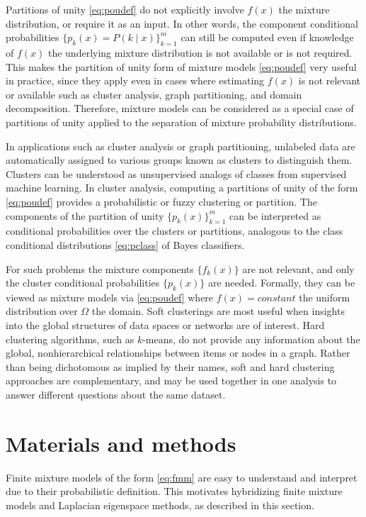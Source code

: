 \documentclass[10pt,letterpaper]{article}
\begin{document}
Partitions of unity \eqref{eq:poudef} do not explicitly involve $f(x)$ the mixture distribution, or require it as an input.
In other words, the component conditional probabilities $\{p_k(x) = P(k\mid x)\}_{k = 1}^m$ can still be computed even if knowledge of $f(x)$ the underlying mixture distribution is not available or is not required.
This makes the partition of unity form of mixture models \eqref{eq:poudef} very useful in practice, since they apply even in cases where estimating $f(x)$ is not relevant or available such as cluster analysis, graph partitioning, and domain decomposition.
Therefore, mixture models can be considered as a special case of partitions of unity applied to the separation of mixture probability distributions.

In applications such as cluster analysis or graph partitioning, unlabeled data are automatically assigned to various groups known as clusters to distinguish them.
Clusters can be understood as unsupervised analogs of classes from supervised machine learning.
In cluster analysis, computing a partitions of unity of the form \eqref{eq:poudef} provides a probabilistic or fuzzy clustering or partition.
The components of the partition of unity $\{p_k(x)\}_{k = 1}^m$ can be interpreted as conditional probabilities over the clusters or partitions, analogous to the class conditional distributions \eqref{eq:pclass} of Bayes classifiers.

For such problems the mixture components $\{f_k(x)\}$ are not relevant, and only the cluster conditional probabilities $\{p_k(x)\}$ are needed.
Formally, they can be viewed as mixture models via \eqref{eq:poudef} where $f(x) = constant$ the uniform distribution over $\Omega$ the domain.
Soft clusterings are most useful when insights into the global structures of data spaces or networks are of interest.
Hard clustering algorithms, such as $k$-means, do not provide any information about the global, nonhierarchical relationships between items or nodes in a graph.
Rather than being dichotomous as implied by their names, soft and hard clustering approaches are complementary, and may be used together in one analysis to answer different questions about the same dataset.
\section*{Materials and methods}\label{sec:methods}
Finite mixture models of the form \eqref{eq:fmm} are easy to understand and interpret due to their probabilistic definition.
This motivates hybridizing finite mixture models and Laplacian eigenspace methods, as described in this section.
\end{document}
